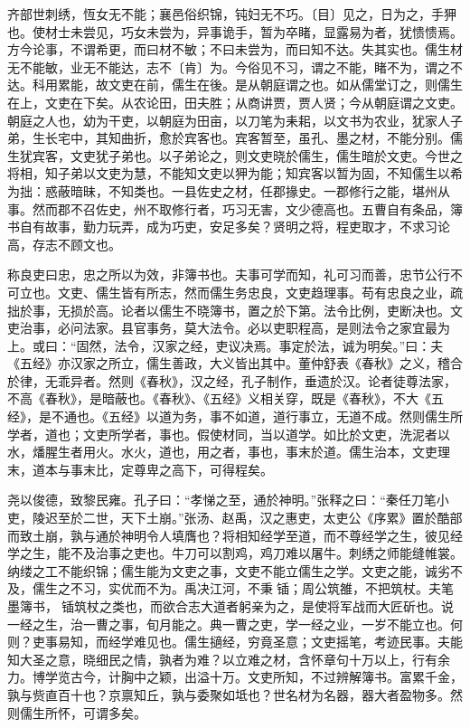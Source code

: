 \documentclass[]{article}
\begin{document}
齐部世刺绣，恆女无不能；襄邑俗织锦，钝妇无不巧。〔目〕见之，日为之，手狎也。使材士未尝见，巧女未尝为，异事诡手，暂为卒睹，显露易为者，犹愦愦焉。方今论事，不谓希更，而曰材不敏；不曰未尝为，而曰知不达。失其实也。儒生材无不能敏，业无不能达，志不〔肯〕为。今俗见不习，谓之不能，睹不为，谓之不达。科用累能，故文吏在前，儒生在後。是从朝庭谓之也。如从儒堂订之，则儒生在上，文吏在下矣。从农论田，田夫胜；从商讲贾，贾人贤；今从朝庭谓之文吏。朝庭之人也，幼为干吏，以朝庭为田亩，以刀笔为耒耜，以文书为农业，犹家人子弟，生长宅中，其知曲折，愈於宾客也。宾客暂至，虽孔、墨之材，不能分别。儒生犹宾客，文吏犹子弟也。以子弟论之，则文吏晓於儒生，儒生暗於文吏。今世之将相，知子弟以文吏为慧，不能知文吏以狎为能；知宾客以暂为固，不知儒生以希为拙：惑蔽暗昧，不知类也。一县佐史之材，任郡掾史。一郡修行之能，堪州从事。然而郡不召佐史，州不取修行者，巧习无害，文少德高也。五曹自有条品，簿书自有故事，勤力玩弄，成为巧吏，安足多矣？贤明之将，程吏取才，不求习论高，存志不顾文也。

称良吏曰忠，忠之所以为效，非簿书也。夫事可学而知，礼可习而善，忠节公行不可立也。文吏、儒生皆有所志，然而儒生务忠良，文吏趋理事。苟有忠良之业，疏拙於事，无损於高。论者以儒生不晓簿书，置之於下第。法令比例，吏断决也。文吏治事，必问法家。县官事务，莫大法令。必以吏职程高，是则法令之家宜最为上。或曰：``固然，法令，汉家之经，吏议决焉。事定於法，诚为明矣。''曰：夫《五经》亦汉家之所立，儒生善政，大义皆出其中。董仲舒表《春秋》之义，稽合於律，无乖异者。然则《春秋》，汉之经，孔子制作，垂遗於汉。论者徒尊法家，不高《春秋》，是暗蔽也。《春秋》、《五经》义相关穿，既是《春秋》，不大《五经》，是不通也。《五经》以道为务，事不如道，道行事立，无道不成。然则儒生所学者，道也；文吏所学者，事也。假使材同，当以道学。如比於文吏，洗泥者以水，燔腥生者用火。水火，道也，用之者，事也，事末於道。儒生治本，文吏理末，道本与事末比，定尊卑之高下，可得程矣。

尧以俊德，致黎民雍。孔子曰：``孝悌之至，通於神明。''张释之曰：``秦任刀笔小吏，陵迟至於二世，天下土崩。''张汤、赵禹，汉之惠吏，太吏公《序累》置於酷部而致土崩，孰与通於神明令人填膺也？将相知经学至道，而不尊经学之生，彼见经学之生，能不及治事之吏也。牛刀可以割鸡，鸡刀难以屠牛。刺绣之师能缝帷裳。纳缕之工不能织锦；儒生能为文吏之事，文吏不能立儒生之学。文吏之能，诚劣不及，儒生之不习，实优而不为。禹决江河，不秉锸；周公筑雒，不把筑杖。夫笔墨簿书，锸筑杖之类也，而欲合志大道者躬亲为之，是使将军战而大匠斫也。说一经之生，治一曹之事，旬月能之。典一曹之吏，学一经之业，一岁不能立也。何则？吏事易知，而经学难见也。儒生擿经，穷竟圣意；文吏摇笔，考迹民事。夫能知大圣之意，晓细民之情，孰者为难？以立难之材，含怀章句十万以上，行有余力。博学览古今，计胸中之颖，出溢十万。文吏所知，不过辨解簿书。富累千金，孰与赀直百十也？京禀知丘，孰与委聚如坻也？世名材为名器，器大者盈物多。然则儒生所怀，可谓多矣。
\end{document}
